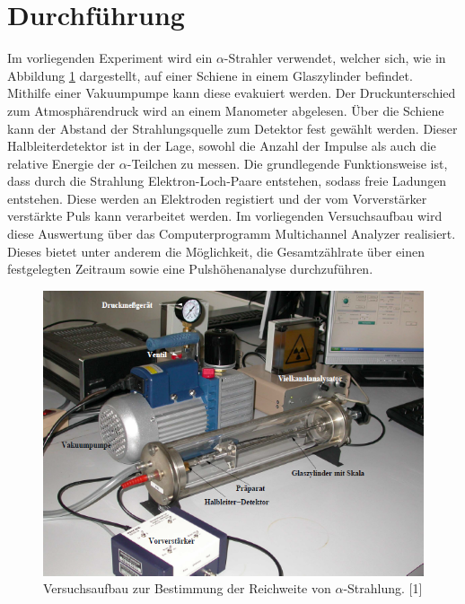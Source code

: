 \section{Durchführung}
\label{sec:Durchführung}

Im vorliegenden Experiment wird ein $\alpha$-Strahler verwendet, welcher sich, wie in Abbildung \ref{fig:aufbau} 
dargestellt, auf einer Schiene in einem Glaszylinder befindet. Mithilfe einer Vakuumpumpe kann diese
evakuiert werden. Der Druckunterschied zum Atmosphärendruck wird an einem Manometer abgelesen.
Über die Schiene kann der Abstand der Strahlungsquelle zum Detektor fest gewählt werden. Dieser 
Halbleiterdetektor ist in der Lage, sowohl die Anzahl der Impulse als auch die relative Energie 
der $\alpha$-Teilchen zu messen. Die grundlegende Funktionsweise ist, dass durch die Strahlung 
Elektron-Loch-Paare entstehen, sodass freie Ladungen entstehen. Diese werden an Elektroden 
registiert und der vom Vorverstärker verstärkte Puls kann verarbeitet werden. Im vorliegenden 
Versuchsaufbau wird diese Auswertung über das Computerprogramm Multichannel Analyzer realisiert. 
Dieses bietet unter anderem die Möglichkeit, die Gesamtzählrate über einen festgelegten Zeitraum 
sowie eine Pulshöhenanalyse durchzuführen. 

\begin{figure}
  \centering
  \includegraphics[scale=0.3]{content/Aufbau.png}
  \caption{Versuchsaufbau zur Bestimmung der Reichweite von $\alpha$-Strahlung. [1]}
  \label{fig:aufbau}
\end{figure}

